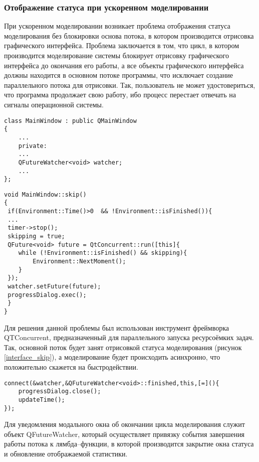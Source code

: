 \subsubsection{Отображение статуса при ускоренном моделировании}
При ускоренном моделировании возникает проблема отображения статуса моделирования без блокировки основа потока, в котором производится отрисовка графического интерфейса. Проблема заключается в том, что цикл, в котором производится моделирование системы блокирует отрисовку графического интерфейса до окончания его работы, а все объекты графического интерфейса должны находится в основном потоке программы, что исключает создание параллельного потока для отрисовки. Так, пользователь не может удостовериться, что программа продолжает свою работу, ибо процесс перестает отвечать на сигналы операционной системы.
\begin{lstlisting}
class MainWindow : public QMainWindow
{
	...
	private:
	...
	QFutureWatcher<void> watcher;
	...
};
\end{lstlisting}
\begin{lstlisting}
void MainWindow::skip()
{
 if(Environment::Time()>0  && !Environment::isFinished()){
 ...
 timer->stop();
 skipping = true;
 QFuture<void> future = QtConcurrent::run([this]{
	while (!Environment::isFinished() && skipping){
		Environment::NextMoment();
	}
 });
 watcher.setFuture(future);
 progressDialog.exec();
 }
}
\end{lstlisting}

Для решения данной проблемы был использован инструмент фреймворка QTConcurrent, предназначенный для параллельного запуска ресурсоёмких задач. Так, основной поток будет занят отрисовкой статуса моделирования (рисунок \ref{interface_skip}), а моделирование будет происходить асинхронно, что положительно скажется на быстродействии.
\begin{lstlisting}
connect(&watcher,&QFutureWatcher<void>::finished,this,[=](){
	progressDialog.close();
	updateTime();
});
\end{lstlisting}
Для уведомления модального окна об окончании цикла моделирования служит объект QFutureWatcher, который осуществляет привязку события завершения работы потока к лямбда--функции, в которой производится закрытие окна статуса и обновление отображаемой статистики.
\clearpage